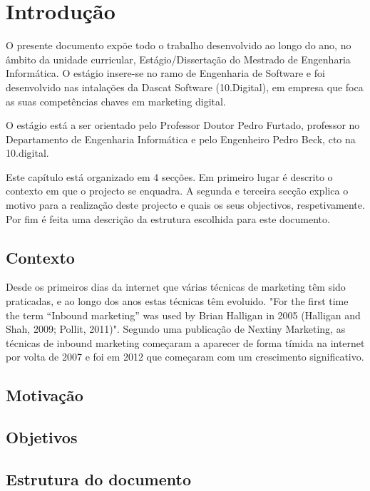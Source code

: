 \chapter{Introdução}
\label{sec:introducao}

O presente documento expõe todo o trabalho desenvolvido ao longo do ano, no âmbito da unidade curricular, Estágio/Dissertação do Mestrado de Engenharia Informática. O estágio insere-se no ramo de Engenharia de Software e foi desenvolvido nas intalações da Dascat Software (10.Digital)\cite{10}, em empresa que foca as suas competências chaves em marketing digital. 

O estágio está a ser orientado pelo Professor Doutor Pedro Furtado, professor no Departamento de Engenharia Informática e pelo Engenheiro Pedro Beck, \acrshort{cto} na 10.digital.

Este capítulo está organizado em 4 secções. Em primeiro lugar é descrito o contexto em que o projecto se enquadra. A segunda e terceira secção explica o motivo para a realização deste projecto e quais os seus objectivos, respetivamente. Por fim é feita uma descrição da estrutura escolhida para este documento.

\section{Contexto}
\label{subsec:contexto}

Desde os primeiros dias da internet que várias técnicas de marketing têm sido praticadas, e ao longo dos anos estas técnicas têm evoluido. "For the first time the term “Inbound marketing” was used by Brian Halligan in 2005 (Halligan and Shah, 2009; Pollit, 2011)"\cite{bookinbound}\cite{inbound_paper}. Segundo uma publicação de Nextiny Marketing\cite{postNextiny}, as técnicas de inbound marketing começaram a aparecer de forma tímida na internet por volta de 2007 e foi em 2012 que começaram com um crescimento significativo.


\section{Motivação}
\label{subsec:motivacao}


\section{Objetivos}
\label{subsec:objetivos}



\section{Estrutura do documento}
\label{subsec:estrutura}

